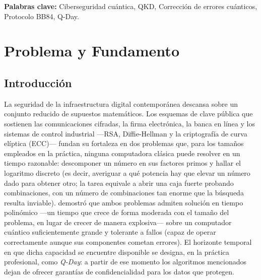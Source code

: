 \documentclass[12pt]{report}
\begin{document}
\vspace{0.5cm}
\noindent \textbf{Palabras clave:} Ciberseguridad cuántica, QKD, Corrección de errores cuánticos, Protocolo BB84, Q-Day.

\tableofcontents
\newpage


\chapter{Problema y Fundamento}

\section{Introducción}

La seguridad de la infraestructura digital contemporánea descansa sobre un
conjunto reducido de supuestos matemáticos. Los esquemas de clave pública que
sostienen las comunicaciones cifradas, la firma electrónica, la banca en línea y
los sistemas de control industrial —RSA, Diffie-Hellman y la criptografía de
curva elíptica (ECC)— fundan su fortaleza en dos problemas que, para los tamaños
empleados en la práctica, ninguna computadora clásica puede resolver en un
tiempo razonable: descomponer un número en sus factores primos y hallar el
logaritmo discreto (es decir, averiguar a qué potencia hay que elevar un número
dado para obtener otro; la tarea equivale a abrir una caja fuerte probando
combinaciones, con un número de combinaciones tan enorme que la búsqueda
resulta inviable). \citet{shor1997} demostró que ambos problemas admiten solución
en tiempo polinómico —un tiempo que crece de forma moderada con el tamaño del
problema, en lugar de crecer de manera explosiva— sobre un computador cuántico
suficientemente grande y tolerante a fallos (capaz de operar correctamente
aunque sus componentes cometan errores). El horizonte temporal en que dicha
capacidad se encuentre disponible se designa, en la práctica profesional, como
\textit{Q-Day}: a partir de ese momento los algoritmos mencionados dejan de
ofrecer garantías de confidencialidad para los datos que protegen.
\end{document}
